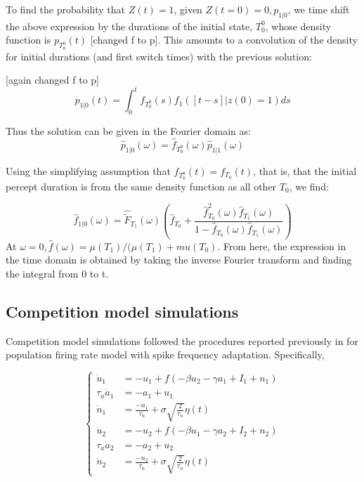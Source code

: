 \documentclass{frontiersSCNS} %
\begin{document}
To find the probability that $Z(t)=1$, given $Z(t=0)=0, p_{1|0}$, we time shift the above expression by the durations of the initial state, $T_0^0$, whose density function is $p_{T_0^0}(t)$ [changed f to p]. This amounts to a convolution of the density for initial durations (and first switch times) with the previous solution:

[again changed f to p]
\begin{equation}
p_{1|0}(t) = \int_0^t f_{T_0^0}(s) f_{1}([t-s]|z(0)=1) ds
\end{equation}

Thus the solution can be given in the Fourier domain as:
\begin{equation}
\hat{p}_{1|0}(\omega) = \hat{f}_{T_0^0}(\omega) \hat{p}_{1|1} (\omega)
\end{equation}

Using the simplifying assumption that ${f}_{T_0^0}(t) = {f}_{T_0}(t)$, that is, that the initial percept duration is from the same density function as all other $T_0$, we find:
 
\begin{equation}
\hat{f}_{1|0}(\omega) = \hat{\tilde{F}}_{T_1}(\omega)
\left( \hat{f}_{T_0} + \frac{\hat{f}_{T_0}^2(\omega)\hat{f}_{T_1}(\omega)}{1-\hat{f}_{T_0}(\omega)\hat{f}_{T_1}(\omega)}\right)
\end{equation}
At $\omega = 0, \hat{f}(\omega) = \mu(T_1) / (\mu(T_1) + mu(T_0)$. From here, the expression in the time domain is obtained by taking the inverse Fourier transform and finding the integral from 0 to t.  

\subsection*{Competition model simulations}
Competition model simulations followed the procedures reported previously in \cite{Shpiro2009} for population firing rate model with spike frequency adaptation. Specifically,

\begin{equation*}
	\begin{cases}
	\dot{u}_1 & = -u_1 +  f(-\beta u_2 - \gamma a_1 + I_1 + n_1) \\
	\tau_a \dot{a}_1 & = -a_1 + u_1\\
	\dot{n}_1 & = \frac{-n_1}{\tau_n} + \sigma \sqrt{\frac{2}{\tau_n}} \eta(t)\\
	\dot{u}_2 & = -u_2 +  f(-\beta u_1 - \gamma a_2 + I_2 + n_2) \\
	\tau_a \dot{a}_2 & = -a_2 + u_2\\
	\dot{n}_2 & = \frac{-n_2}{\tau_n } + \sigma \sqrt{\frac{2}{\tau_n}} \eta(t)
	
	\end{cases}
\end{equation*}
\end{document}
